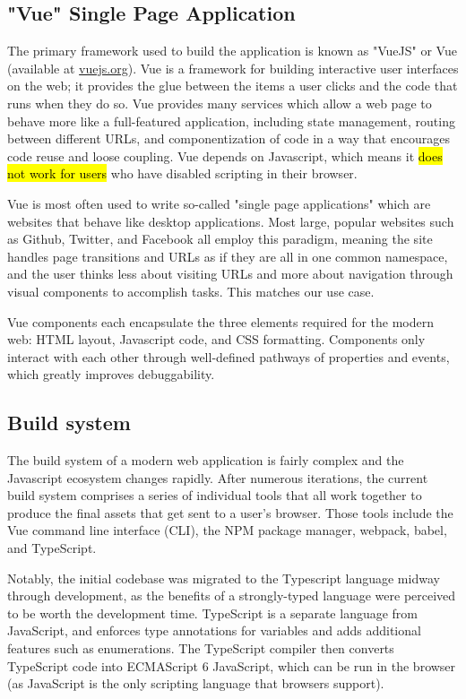 \documentclass[Afour,sagev,times]{sagej}
\begin{document}
\subsection{"Vue" Single Page Application}

The primary framework used to build the application is known as "VueJS" or Vue (available at \url{vuejs.org}). Vue is a framework for building interactive user interfaces on the web; it provides the glue between the items a user clicks and the code that runs when they do so. Vue provides many services which allow a web page to behave more like a full-featured application, including state management, routing between different URLs, and componentization of code in a way that encourages code reuse and loose coupling. Vue depends on Javascript, which means it \hl{does not work for users} who have disabled scripting in their browser.

Vue is most often used to write so-called "single page applications" which are websites that behave like desktop applications. Most large, popular websites such as Github, Twitter, and Facebook all employ this paradigm, meaning the site handles page transitions and URLs as if they are all in one common namespace, and the user thinks less about visiting URLs and more about navigation through visual components to accomplish tasks. This matches our use case.

Vue components each encapsulate the three elements required for the modern web: HTML layout, Javascript code, and CSS formatting. Components only interact with each other through well-defined pathways of properties and events, which greatly improves debuggability.

\subsection{Build system}

The build system of a modern web application is fairly complex and the Javascript ecosystem changes rapidly. After numerous iterations, the current build system comprises a series of individual tools that all work together to produce the final assets that get sent to a user's browser. Those tools include the Vue command line interface (CLI), the NPM package manager, webpack, babel, and TypeScript.

Notably, the initial codebase was migrated to the Typescript language midway through development, as the benefits of a strongly-typed language were perceived to be worth the development time. TypeScript is a separate language from JavaScript, and enforces type annotations for variables and adds additional features such as enumerations. The TypeScript compiler then converts TypeScript code into ECMAScript 6 JavaScript, which can be run in the browser (as JavaScript is the only scripting language that browsers support).
\end{document}

